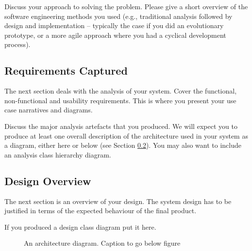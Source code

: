 \documentclass[11pt,a4paper]{article}
\begin{document}
Discuss your approach to solving the problem. Please give a short
overview of the software engineering methods you used (e.g.,
traditional analysis followed by design and implementation -- typically
the case if you did an evolutionary prototype, or a more agile
approach where you had a cyclical development process). 

\subsection{Requirements Captured}

The next section deals with the analysis of your system. Cover the
functional, non-functional and usability requirements. This is where
you present your use case narratives and diagrams. 

Discuss the major analysis artefacts that you produced. We will expect
you to produce at least one overall description of the architecture
used in your system as a diagram, either here or below (see Section
\ref{ss:design-overview}). You may also want to include an analysis
class hierarchy diagram.

\subsection{Design Overview}
\label{ss:design-overview}

The next section is an overview of your design. The system design has
to be justified in terms of the expected behaviour of the final
product. 

If you produced a design class diagram put it here.

\begin{figure}[h!]
  \caption{An architecture diagram. Caption to go below figure}
  \label{fig:architecture}
\end{figure}
\end{document}
